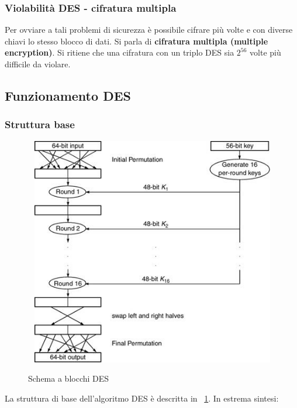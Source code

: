 \subsubsection{Violabilità DES - cifratura multipla}
Per ovviare a tali problemi di sicurezza è possibile cifrare più volte e con diverse chiavi lo stesso blocco di dati. Si parla di \textbf{cifratura multipla (multiple encryption)}. Si ritiene che una cifratura con un triplo DES sia
$2^{56}$ volte più difficile da violare.

\subsection{Funzionamento DES}
\subsubsection{Struttura base}
\begin{figure}[htbp]
	\centering%
	\subfigure%
	{\includegraphics[height=10cm, width=13cm, keepaspectratio]{Immagini/Capitolo2/des_structure.png}}
	\caption{Schema a blocchi DES \label{fig:des_struct}} 	
\end{figure}
La struttura di base dell'algoritmo DES è descritta in \figurename ~\ref{fig:des_struct}. In estrema sintesi:
